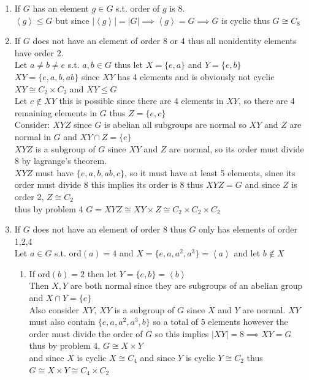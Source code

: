 \documentclass[12pt, letterpaper]{article}
\theoremstyle{definition}
\newcommand{\ang}[1]{\left\langle #1 \right\rangle}
\begin{document}
\begin{enumerate}
    \item If $G$ has an element $g \in G$ s.t. order of $g$ is 8.\\
    $\ang{g} \leq G$ but since $|\ang{g}|=|G| \implies \ang{g}=G \implies G$ is cyclic thus $G \cong C_8$
    \item If $G$ does not have an element of order 8 or 4 thus all nonidentity elements have order 2.\\
    Let $a\neq b \neq e$ s.t. $a,b \in G$ thus let $X=\{e,a\}$ and $Y=\{e,b\}$\\
    $XY=\{e,a,b,ab\}$ since $XY$ has 4 elements and is obviously not cyclic $XY \cong C_2 \times C_2$ and $XY \leq G$\\
    Let $c \notin XY$ this is possible since there are 4 elements in $XY$, so there are 4 remaining elements in $G$ thus $Z=\{e,c\}$\\
    Consider: $XYZ$ since $G$ is abelian all subgroups are normal so $XY$ and $Z$ are normal in $G$ and $XY \cap Z = \{e\}$\\
    $XYZ$ is a subgroup of $G$ since $XY$ and $Z$ are normal, so its order must divide $8$ by lagrange's theorem.\\
    $XYZ$ must have $\{e,a,b,ab,c\}$, so it must have at least 5 elements, since its order must divide 8 this implies its order is 8 thus $XYZ=G$ and since $Z$ is order 2, $Z \cong C_2$\\
    thus by problem 4 $G=XYZ \cong XY \times Z \cong C_2\times C_2 \times C_2$
    \item If $G$ does not have an element of order 8 thus $G$ only has elements of order 1,2,4\\
    Let $a \in G$ s.t. ord$(a)=4$ and $X=\{e,a,a^2,a^3\}=\ang{a}$ and let $b \notin X$
    \begin{enumerate}
        \item If ord$(b)=2$ then let $Y=\{e,b\}=\ang{b}$\\
        Then $X,Y$ are both normal since they are subgroups of an abelian group and $X \cap Y = \{e\}$\\
        Also consider $XY$, $XY$ is a subgroup of $G$ since $X$ and $Y$ are normal. $XY$ must also contain $\{e,a,a^2,a^3,b\}$ so a total of 5 elements
        however the order must divide the order of $G$ so this implies $|XY|=8 \implies XY=G$ thus by problem 4, $G \cong X \times Y$\\
        and since $X$ is cyclic $X \cong C_4$ and since $Y$ is cyclic $Y \cong C_2$ thus $G \cong X \times Y \cong C_4 \times C_2$

\end{enumerate}
\end{enumerate}
\end{document}
